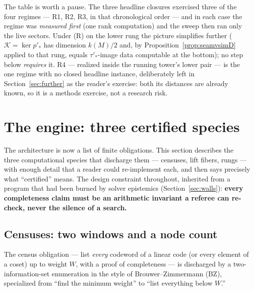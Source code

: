 \documentclass[11pt]{article}
\theoremstyle{plain}
\theoremstyle{definition}
\theoremstyle{remark}
\begin{document}
The table is worth a pause. The three headline closures exercised three
of the four regimes --- R1, R2, R3, in that chronological order --- and
in each case the regime was \emph{measured first} (one rank computation)
and the sweep then ran only the live sectors. Under (R) on the lower rung
the picture simplifies further ($\mathcal{K} = \ker p'_* $ has dimension
$k(M)/2$ and, by Proposition~\ref{prop:seamvsimD} applied to that rung,
equals $\tau'_*$-image data computable at the bottom); no step below
\emph{requires} it. R4 --- realized inside the running tower's lower pair
--- is the one regime with no closed headline instance, deliberately left
in Section~\ref{sec:further} as the reader's exercise: both its distances
are already known, so it is a methods exercise, not a research risk.

\section{The engine: three certified species}
\label{sec:engine}

The architecture is now a list of finite obligations. This section
describes the three computational species that discharge them ---
censuses, lift fibers, rungs --- with enough detail that a reader could
re-implement each, and then says precisely what ``certified'' means. The
design constraint throughout, inherited from a program that had been
burned by solver epistemics (Section~\ref{sec:walls}): \textbf{every
completeness claim must be an arithmetic invariant a referee can re-check,
never the silence of a search.}

\subsection{Censuses: two windows and a node count}
\label{sec:bz}

The census obligation --- list \emph{every} codeword of a linear code (or
every element of a coset) up to weight $W$, with a proof of completeness
--- is discharged by a two-information-set enumeration in the style of
Brouwer--Zimmermann (BZ), specialized from ``find the minimum weight'' to
``list everything below $W$.''
\end{document}
